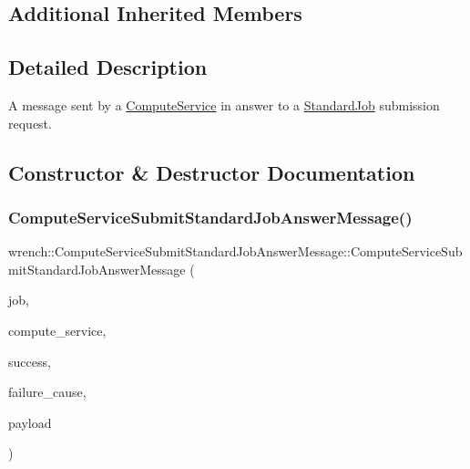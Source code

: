 \subsection*{Additional Inherited Members}


\subsection{Detailed Description}
A message sent by a \hyperlink{classwrench_1_1_compute_service}{Compute\+Service} in answer to a \hyperlink{classwrench_1_1_standard_job}{Standard\+Job} submission request. 

\subsection{Constructor \& Destructor Documentation}
\mbox{\label{classwrench_1_1_compute_service_submit_standard_job_answer_message_adf8c3914db94b1d9a8e346cc1369182f}} 
\subsubsection{\texorpdfstring{Compute\+Service\+Submit\+Standard\+Job\+Answer\+Message()}{ComputeServiceSubmitStandardJobAnswerMessage()}}
{\footnotesize\ttfamily wrench\+::\+Compute\+Service\+Submit\+Standard\+Job\+Answer\+Message\+::\+Compute\+Service\+Submit\+Standard\+Job\+Answer\+Message (\begin{DoxyParamCaption}\item[{\hyperlink{classwrench_1_1_standard_job}{Standard\+Job} $\ast$}]{job,  }\item[{\hyperlink{classwrench_1_1_compute_service}{Compute\+Service} $\ast$}]{compute\+\_\+service,  }\item[{bool}]{success,  }\item[{std\+::shared\+\_\+ptr$<$ \hyperlink{classwrench_1_1_failure_cause}{Failure\+Cause} $>$}]{failure\+\_\+cause,  }\item[{double}]{payload }\end{DoxyParamCaption})}



